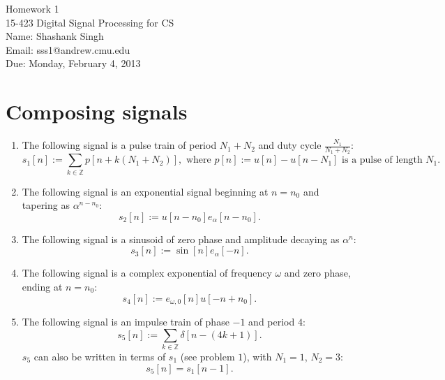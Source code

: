 \documentclass[11pt]{article}
\makeatletter
\newcommand{\myname}{Shashank Singh}
\newcommand{\myandrew}{sss1@andrew.cmu.edu}
\newcommand{\myclass}{15-423 Digital Signal Processing for CS}
\newcommand{\myhwnum}{1}
\newcommand{\duedate}{Monday, February 4, 2013}
\newcommand{\Z}{\mathbb{Z}} %
\makeatother
\begin{document}
\thispagestyle{plain}

{\Large Homework \myhwnum} \\
\myclass \\
Name: \myname \\
Email: \myandrew \\
Due: \duedate

\section{Composing signals}
\begin{enumerate}
\item The following signal is a pulse train of period $N_1 + N_2$ and duty
cycle $\displaystyle \frac{N_1}{N_1 + N_2}$:
\[s_1[n]
 := \sum_{k \in \Z} p[n + k(N_1 + N_2)],
 \mbox{ where $p[n] := u[n] - u[n - N_1]$ is a pulse of length $N_1$.}
\]
 
\item The following signal is an exponential signal beginning at $n = n_0$ and
tapering as $\alpha^{n - n_0}$:
\[s_2[n]
 := u[n - n_0]e_{\alpha}[n - n_0].
\]
 
\item The following signal is a sinusoid of zero phase and amplitude decaying
as $\alpha^n$:
\[s_3[n]
 := \sin[n]e_{\alpha}[-n].
\]
 
\item The following signal is a complex exponential of frequency $\omega$ and
zero phase, ending at $n = n_0$:
\[s_4[n]
 := e_{\omega,0}[n]u[-n + n_0].
\]
 
\item The following signal is an impulse train of phase $-1$ and period $4$:
\[s_5[n]
 := \sum_{k \in \Z} \delta[n - (4k + 1)].
\]
$s_5$ can also be written in terms of $s_1$ (see problem $1$), with $N_1 = 1$,
$N_2 = 3$:
\[s_5[n]
 = s_1[n - 1].
 \]
\end{enumerate}

\newpage
\end{document}
